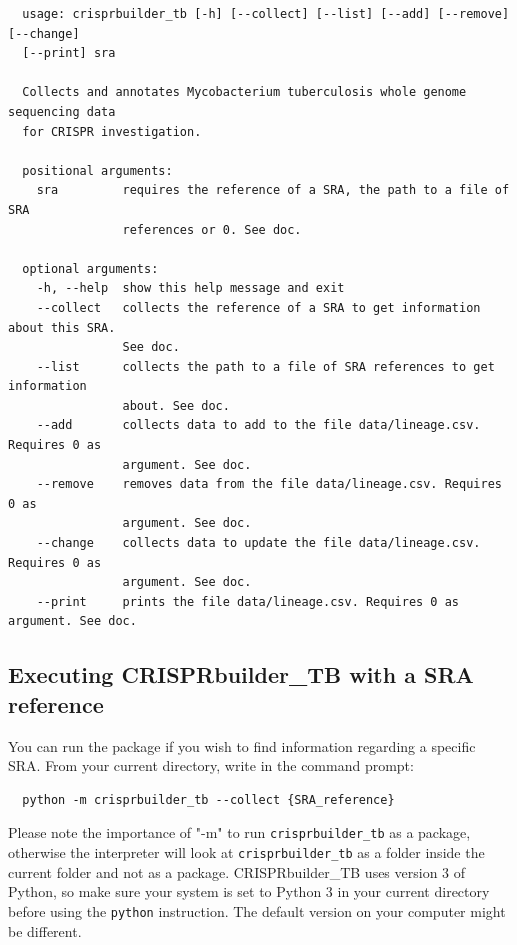 \documentclass[twoside,a4paper,11pt,frenchb,openany]{report}
\begin{document}
    \begin{verbatim}
  usage: crisprbuilder_tb [-h] [--collect] [--list] [--add] [--remove] [--change]
  [--print] sra

  Collects and annotates Mycobacterium tuberculosis whole genome sequencing data
  for CRISPR investigation.

  positional arguments:
    sra         requires the reference of a SRA, the path to a file of SRA 
                references or 0. See doc.

  optional arguments:
    -h, --help  show this help message and exit
    --collect   collects the reference of a SRA to get information about this SRA. 
                See doc.
    --list      collects the path to a file of SRA references to get information 
                about. See doc.
    --add       collects data to add to the file data/lineage.csv. Requires 0 as 
                argument. See doc.
    --remove    removes data from the file data/lineage.csv. Requires 0 as 
                argument. See doc.
    --change    collects data to update the file data/lineage.csv. Requires 0 as
                argument. See doc.
    --print     prints the file data/lineage.csv. Requires 0 as argument. See doc.
\end{verbatim}



    \subsection{Executing CRISPRbuilder\_TB with a SRA
reference}\label{executing-crisprbuilder_tb-with-a-sra-reference}

    You can run the package if you wish to find information regarding a
specific SRA. From your current directory, write in the command prompt:

    \begin{verbatim}
  python -m crisprbuilder_tb --collect {SRA_reference}
\end{verbatim}

    Please note the importance of "-m" to run \texttt{crisprbuilder\_tb} as a
package, otherwise the interpreter will look at \texttt{crisprbuilder\_tb} as a folder inside the current folder and not as a package. CRISPRbuilder\_TB uses version 3 of Python, so make sure your system is set to Python 3 in your current directory before using the
\texttt{python} instruction. The default version on your computer might
be different.
\end{document}
